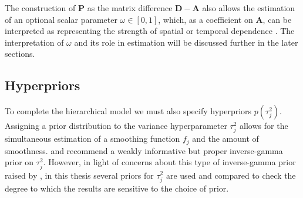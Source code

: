 The construction of $\mathbf{P}$ as the matrix difference $\mathbf{D} - \mathbf{A}$ also allows the estimation of an optional scalar parameter $\omega \in [0,1]$, which, as a coefficient on $\mathbf{A}$, can be interpreted as representing the strength of spatial or temporal dependence . The interpretation of $\omega$ and its role in estimation will be discussed further in the later sections. 


\subsection{Hyperpriors}

To complete the hierarchical model we must also specify hyperpriors $p(\tau_j^2)$.  Assigning a prior distribution to the variance hyperparameter $\tau_j^2$ allows for the simultaneous estimation of a smoothing function $f_j$ and the amount of smoothness.   and  recommend a weakly informative but proper inverse-gamma prior on $\tau_j^2$. However, in light of concerns about this type of inverse-gamma prior raised by , in this thesis several priors for $\tau^2_j$ are used and compared to check the degree to which the results are sensitive to the choice of prior.

